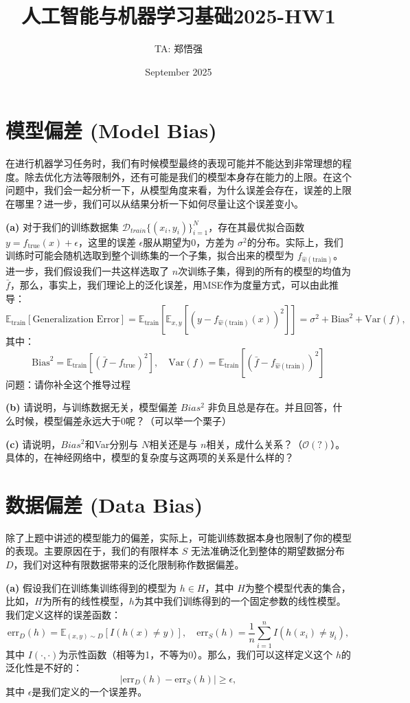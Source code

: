 \documentclass{article}
\title{人工智能与机器学习基础2025-HW1}
\author{TA: 郑悟强}
\date{September 2025}
\begin{document}
\maketitle
\section{模型偏差 (Model Bias)}
在进行机器学习任务时，我们有时候模型最终的表现可能并不能达到非常理想的程度。除去优化方法等限制外，还有可能是我们的模型本身存在能力的上限。在这个问题中，我们会一起分析一下，从模型角度来看，为什么误差会存在，误差的上限在哪里？进一步，我们可以从结果分析一下如何尽量让这个误差变小。

\noindent\textbf{(a)}
对于我们的训练数据集 $\mathcal{D}_{train}\{(x_i, y_i)\}_{i=1}^N$，存在其最优拟合函数$y = f_{\text{true}}(x) + \epsilon$，这里的误差 $\epsilon$服从期望为0，方差为 $\sigma^2$的分布。实际上，我们训练时可能会随机选取到整个训练集的一个子集，拟合出来的模型为 $f_{\hat{w}(\text{train})}$。进一步，我们假设我们一共这样选取了 $n$次训练子集，得到的所有的模型的均值为 $\bar{f}$，那么，事实上，我们理论上的泛化误差，用MSE作为度量方式，可以由此推导：
\begin{equation}
    \mathbb{E}_{\text{train}}[\text{{Generalization Error}}] = \mathbb{E}_{\text{train}}[\mathbb{E}_{x, y}[(y - f_{\hat{w}(\text{train})}(x))^2]] = \sigma^2 + \text{Bias}^2 + \text{Var}(f),
\end{equation}
其中：
$$
\text{Bias}^2 = \mathbb{E}_{\text{train}}[(\bar{f} - f_{\text{true}})^2], \quad \text{Var}(f) = \mathbb{E}_{\text{train}}[(\bar{f} - f_{\hat{w}(\text{train})})^2]
$$
问题：请你补全这个推导过程

\noindent\textbf{(b)}
请说明，与训练数据无关，模型偏差 $Bias^2$ 非负且总是存在。并且回答，什么时候，模型偏差永远大于0呢？（可以举一个栗子）

\noindent \textbf{(c)}
请说明，$Bias^2$和Var分别与 $N$相关还是与 $n$相关，成什么关系？（$\mathcal{O}(?)$）。具体的，在神经网络中，模型的复杂度与这两项的关系是什么样的？

\section{数据偏差 (Data Bias)}
除了上题中讲述的模型能力的偏差，实际上，可能训练数据本身也限制了你的模型的表现。主要原因在于，我们的有限样本 $S$ 无法准确泛化到整体的期望数据分布 $D$，我们对这种有限数据带来的泛化限制称作数据偏差。

\noindent \textbf{(a)}
假设我们在训练集训练得到的模型为 $h \in H$，其中 $H$为整个模型代表的集合，比如，$H$为所有的线性模型，$h$为其中我们训练得到的一个固定参数的线性模型。我们定义这样的误差函数：
\begin{equation}
    \text{err}_D(h) = \mathbb{E}_{(x, y) \sim D}[I(h(x) \neq y)], \quad \text{err}_S(h) = \frac{1}{n} \sum_{i=1}^n I(h(x_i) \neq y_i), 
\end{equation}
其中 $I(\cdot, \cdot)$为示性函数（相等为1，不等为0）。那么，我们可以这样定义这个 $h$的泛化性是不好的：
\begin{equation}
    |\text{err}_D(h) - \text{err}_S(h)| \geq \epsilon, 
\end{equation}
其中 $\epsilon$是我们定义的一个误差界。
\end{document}
